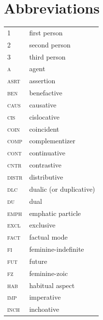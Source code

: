 \documentclass[output=paper,colorlinks,citecolor=brown]{langscibook}
\begin{document}
\section*{Abbreviations}
\begin{tabularx}{.45\textwidth}{@{}lQ@{}}
1 & first person \\
2 & second person \\
3 & third person \\
\textsc{a} & agent \\
\textsc{asrt} & assertion \\
\textsc{ben} &  benefactive \\
\textsc{caus} & causative \\
\textsc{cis} & cislocative \\
\textsc{coin} & coincident \\
\textsc{comp} &  complementizer \\
\textsc{cont} & continuative \\
\textsc{cntr} & contrastive \\
\textsc{distr} & distributive\\
\textsc{dlc} & dualic (or duplicative)  \\ 
\textsc{du} & dual \\
\textsc{emph} & emphatic particle \\
\textsc{excl} & exclusive \\ 
\textsc{fact} & factual mode \\
\textsc{fi} & feminine-indefinite \\
\textsc{fut} & future \\
\textsc{fz} & feminine-zoic \\
\textsc{hab} & habitual aspect \\
\textsc{imp} & imperative \\
\textsc{inch} & inchoative \\
\end{tabularx}
\end{document}
